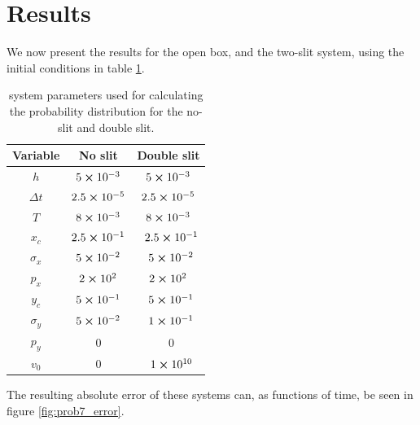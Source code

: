 \documentclass[english,notitlepage,reprint,nofootinbib]{revtex4-2}  %
\begin{document}
	\section{Results}\label{sec:results}
	We now present the results for the open box, and the two-slit system, using the initial conditions in table \ref{tab:1}.
	\begin{table}[h!]
	\centering
	\caption{system parameters used for calculating the probability distribution for the no-slit and double slit.}
	\label{tab:1}
	\begin{tabular}{c | c | c} %
	 Variable& No slit & Double slit\\
	\hline
	$h$                & $5\cross10^{-3}$                &\quad $5\cross10^{-3}$   \\
	$\Delta t$       & $2.5\cross10^{-5}$            &\quad $2.5\cross10^{-5}$  \\
	$T$                & $8\cross10^{-3}$               &\quad $8\cross10^{-3}$     \\
	$x_c$             & $2.5\cross10^{-1}$            &\quad $2.5\cross10^{-1}$  \\
	$\sigma_x$    & $5\cross10^{-2}$               &\quad $5\cross10^{-2}$     \\
	$p_x$             & $2\cross10^{2}$                &\quad $2\cross10^{2}$      \\
	$y_c$             & $5\cross10^{-1}$               &\quad $5\cross10^{-1}$     \\
	$\sigma_y$    & $5\cross10^{-2}$               &\quad $1\cross10^{-1}$     \\
	$p_y$             & $0$                                    &\quad $0$                         \\
	$v_0$             & $0$                                    &\quad $1\cross10^{10}$    \\
	\hline
	\end{tabular}
	\end{table}
	The resulting absolute error of these systems can, as functions of time, be seen in figure \ref{fig:prob7_error}.
	
\end{document}
